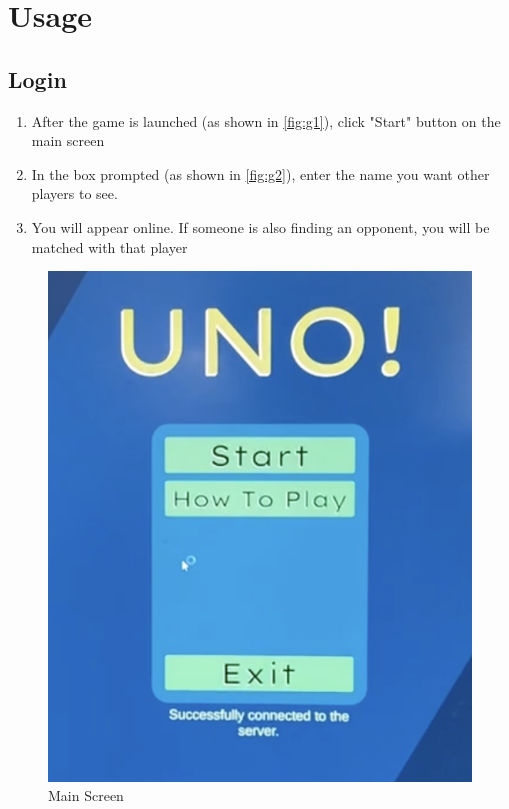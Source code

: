 \documentclass[12pt, titlepage]{article}
\begin{document}
\section{Usage}
\subsection{Login}
\begin{enumerate}
    \item After the game is launched (as shown in \autoref{fig:g1}), click "Start" button on the main screen
    \item In the box prompted (as shown in \autoref{fig:g2}), enter the name you want other players to see.
    \item You will appear online. If someone is also finding an opponent, you will be matched with that player
\end{enumerate}

\begin{figure}[h]
    \centering
    \includegraphics[scale=0.4]{main_Screen.png}
    \caption{Main Screen}
    \label{fig:g1}
\end{figure}
\end{document}

